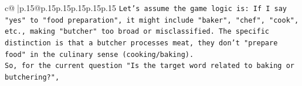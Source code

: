 \documentclass{article}
\begin{document}
{\begin{supertabular}{c@{$\;$}|p{.15\linewidth}@{}p{.15\linewidth}p{.15\linewidth}p{.15\linewidth}p{.15\linewidth}p{.15\linewidth}}
{{{\texttt{Let's assume the game logic is: If I say "yes" to "food preparation", it might include "baker", "chef", "cook", etc., making "butcher" too broad or misclassified. The specific distinction is that a butcher processes meat, they don't "prepare food" in the culinary sense (cooking/baking).} \\
\texttt{So, for the current question "Is the target word related to baking or butchering?",} \\
            }
        }
    }
     \\ \\

\end{supertabular}
}
\end{document}
